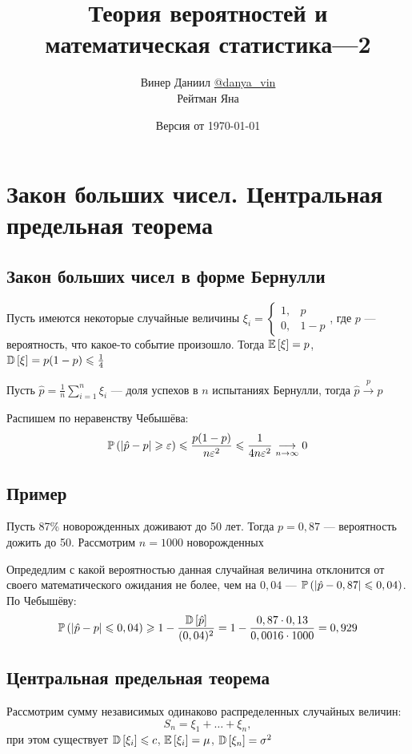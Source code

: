 \documentclass[a4paper, 10pt]{article}
\title{\LARGE{Теория вероятностей и математическая статистика—2}}
\author{Винер Даниил  \href{https://t.me/danya_vin}{@danya\_vin}\\Рейтман Яна}
\date{Версия от \today}
\begin{document}
\maketitle
\tableofcontents
\setlength{\parindent}{15pt}
\setlength{\parskip}{2mm}
\newpage
\section{Закон больших чисел. Центральная предельная теорема}
\subsection{Закон больших чисел в форме Бернулли}
Пусть имеются некоторые случайные величины $\xi_i=\begin{cases}
    1,&p\\
    0,&1-p
\end{cases}$, где $p$ — вероятность, что какое-то событие произошло. Тогда $\mathbb{E}\left[\xi\right]=p$, $\mathbb{D}\left[\xi\right]=p(1-p)\leqslant \frac{1}{4}$

\theorem Пусть $\hat{p}=\frac{1}{n}\sum_{i=1}^{n} \xi_i$ — доля успехов в $n$ испытаниях Бернулли, тогда $\hat{p}\overset{p}{\longrightarrow} p$

\proof Распишем по неравенству Чебышёва: 
\begin{equation*}
    \mathbb{P}\left(|\hat{p}-p|\geqslant\varepsilon\right)\leqslant\frac{p(1-p)}{n\varepsilon^2}\leqslant \frac{1}{4n\varepsilon^2}\underset{n\to\infty}{\longrightarrow}0
\end{equation*}

\subsection*{Пример}
Пусть 87\% новорожденных доживают до 50 лет. Тогда $p=0,87$ — вероятность дожить до 50. Рассмотрим $n=1000$ новорожденных

Опредедлим с какой вероятностью данная случайная величина отклонится от своего математического ожидания не более, чем на $0,04$ — $\mathbb{P}\left(|\hat{p}-0,87|\leqslant 0,04\right)$. По Чебышёву:
\begin{equation*}
    \mathbb{P}\left(|\hat{p}-p|\leqslant 0,04\right)\geqslant1-\frac{\mathbb{D}\left[\hat{p}\right]}{(0,04)^2}=1-\frac{0,87\cdot0,13}{0,0016\cdot1000}=0,929
\end{equation*}

\subsection{Центральная предельная теорема}
Рассмотрим сумму независимых одинаково распределенных случайных величин:
\begin{equation*}
    S_n=\xi_1+\ldots+\xi_n,
\end{equation*}
при этом существует $\mathbb{D}\left[\xi_i\right]\leqslant c$, $\mathbb{E}\left[\xi_i\right]=\mu$, $\mathbb{D}\left[\xi_n\right]=\sigma^2$
\end{document}
